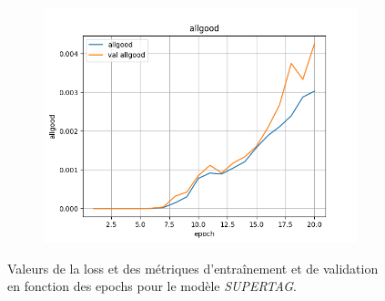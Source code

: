 \documentclass[a4paper]{article}
\begin{document}
\begin{figure}[H]
\begin{subfigure}{0.32\textwidth}
    \end{subfigure}
    \begin{subfigure}{0.32\textwidth}
        \centering
        \includegraphics[width=\linewidth]{../logs/supertag/allgood.png}
    \end{subfigure}
    \caption{Valeurs de la loss et des métriques d'entraînement et de validation en fonction des epochs 
            pour le modèle \textit{SUPERTAG}.}
    \label{fig: results supertag}
\end{figure}

\end{document}

